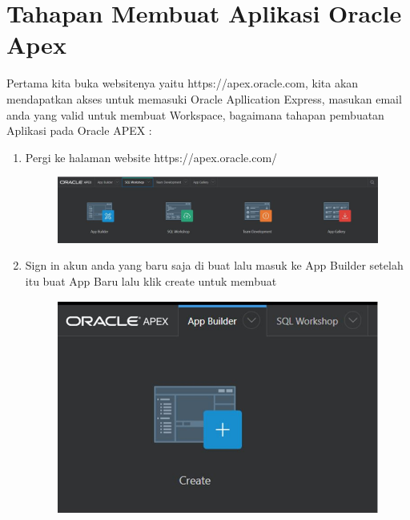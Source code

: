 \section{Tahapan Membuat Aplikasi Oracle Apex}
Pertama kita buka websitenya yaitu https://apex.oracle.com, kita akan mendapatkan akses untuk memasuki Oracle Apllication Express, masukan email anda yang valid untuk membuat Workspace,  bagaimana tahapan pembuatan Aplikasi pada Oracle APEX :
\begin{enumerate}
    \item Pergi ke halaman website https://apex.oracle.com/
           \begin{figure}[!htbp]
    \centering
    \includegraphics[scale=0.4]{section/2.JPG}
    \label{gambar 1}
\end{figure}

\item Sign in akun anda yang baru saja di buat lalu masuk ke App Builder setelah itu buat App Baru lalu klik create untuk membuat
       \begin{figure}[!htbp]
    \centering
    \includegraphics[scale=0.4]{section/3.JPG}
    \label{gambar 1}
\end{figure}


\end{enumerate}
